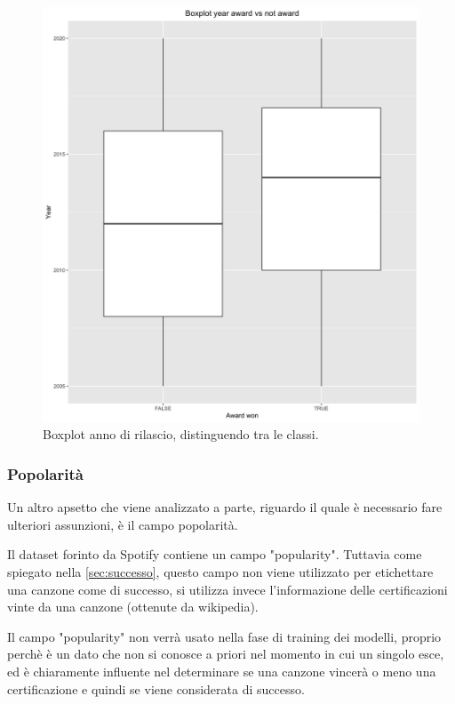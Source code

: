  \begin{figure}[H]
 	\centering
 	\includegraphics[width=13cm]{../images/year_award_comparison.png}
 	\caption{Boxplot anno di rilascio, distinguendo tra le classi.}
 \end{figure}
 
\subsubsection{Popolarità}
\label{sec:popularity}
Un altro apsetto che viene analizzato a parte, riguardo il quale è necessario fare ulteriori assunzioni, è il campo popolarità.

Il dataset forinto da Spotify contiene un campo "popularity". Tuttavia come spiegato nella \autoref{sec:successo}, questo campo non viene utilizzato per etichettare una canzone come di successo, si utilizza invece l'informazione delle certificazioni vinte da una canzone (ottenute da wikipedia).

Il campo "popularity" non verrà usato nella fase di training dei modelli, proprio perchè è un dato che non si conosce a priori nel momento in cui un singolo esce, ed è chiaramente influente nel determinare se una canzone vincerà o meno una certificazione e quindi se viene considerata di successo. 

